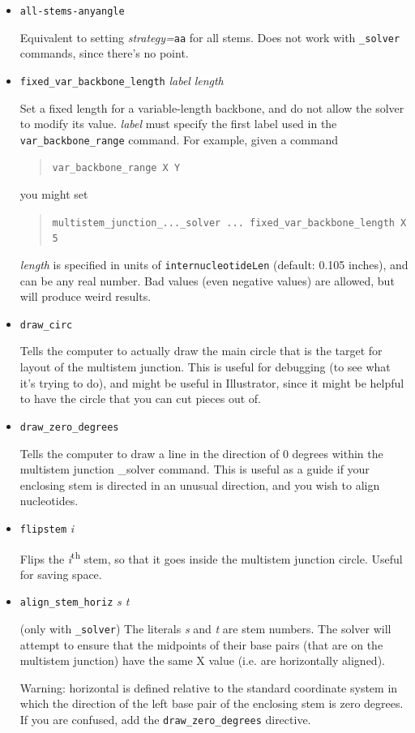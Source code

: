 \documentclass[letterpaper,12pt]{report}
\newcommand{\example}[1]{
\begin{quote}
{\raggedright
#1
}
\end{quote}
}
\newcommand{\examplett}[1]{
\example{{\tt #1}}
}
\begin{document}
\begin{itemize}
\item
{\tt all-stems-anyangle}

Equivalent to setting\textit{ strategy=}{\tt aa} for all stems.  Does not work with {\tt \_solver} commands, since there's no point.

\item {\tt fixed\_var\_backbone\_length} {\it label} {\it length}

Set a fixed length for a variable-length backbone, and do not allow the solver to modify its value.
{\it label} must specify the first label used in the {\tt var\_backbone\_range} command.
For example, given a command
\examplett{var\_backbone\_range X Y}
you might set
\examplett{multistem\_junction\_...\_solver ... fixed\_var\_backbone\_length X 5}
{\it length} is specified in units of {\tt internucleotideLen} (default: 0.105 inches),
and can be any real number.
Bad values (even negative values) are allowed, but will produce weird results.
\item
{\tt draw\_circ}

Tells the computer to actually draw the main circle that is the target for
layout of the multistem junction. This is useful for debugging (to see
what it{\textquoteright}s trying to do), and might be useful in
Illustrator, since it
might be helpful to have the circle that you can cut pieces out of.

\item
{\tt draw\_zero\_degrees}

Tells the computer to draw a line in the direction of 0 degrees within the multistem
junction {\_solver} command.  This is useful as a guide if your enclosing stem is directed in an
unusual direction, and you wish to align nucleotides.

\item
{\tt flipstem}  \textit{i}

Flips the \textit{i}\textsuperscript{th} stem, so that it goes inside
the multistem junction circle.  Useful for saving space.

\item
{\tt align\_stem\_horiz} \textit{ s t}

(only with {\tt \_solver}) The literals \textit{s} and \textit{t} are stem
numbers.  The solver will attempt to ensure that the midpoints of their base pairs
(that are on the multistem junction)
have the same X value (i.e. are horizontally aligned).

Warning: horizontal is defined relative to the standard coordinate system in which
the direction of the left base pair of the enclosing stem is zero degrees.  If you
are confused, add the {\tt draw\_zero\_degrees} directive.


\end{itemize}
\end{document}

